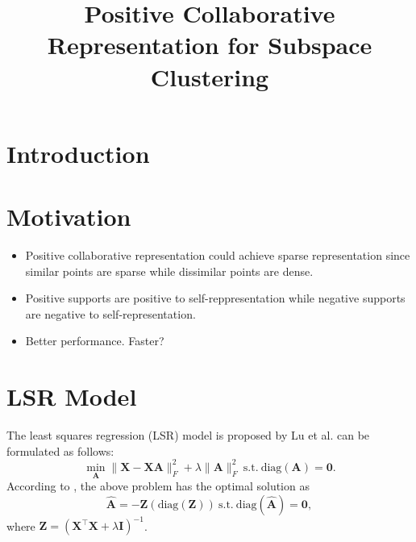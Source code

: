 \documentclass[10pt,twocolumn,letterpaper]{article}
\begin{document}
\title{Positive Collaborative Representation for Subspace Clustering}

\maketitle



\begin{abstract}

\end{abstract}

\section{Introduction}



\section{Motivation}

\begin{itemize}
\item Positive collaborative representation could achieve sparse representation since similar points are sparse while dissimilar points are dense.

\item Positive supports are positive to self-reppresentation while negative supports are negative to self-representation.

\item Better performance. Faster? 
\end{itemize}

\section{LSR Model}
The least squares regression (LSR) model \cite{lu2012robust} is proposed by Lu et al. can be formulated as follows:
\begin{equation}
\label{e1}
\min_{\bm{A}}
\|
\bm{X}
-
\bm{X}\bm{A}
\|_{F}^{2}
+
\lambda
\|
\bm{A}
\|_{F}^{2}
\ 
\text{s.t.}
\ 
\text{diag}(\bm{A})=\bm{0}.
\end{equation}
According to \cite{lu2012robust}, the above problem has the optimal solution as 
\begin{equation}
\label{e2}
\hat{\bm{A}}
=
-\bm{\bm{Z}}(\text{diag}(\bm{Z}))
\
\text{s.t.} 
\
\text{diag}(\hat{\bm{A}})=\bm{0}
,
\end{equation}
where $\bm{Z}=(\bm{X}^{\top}\bm{X}+\lambda\bm{I})^{-1}$.
\end{document}
